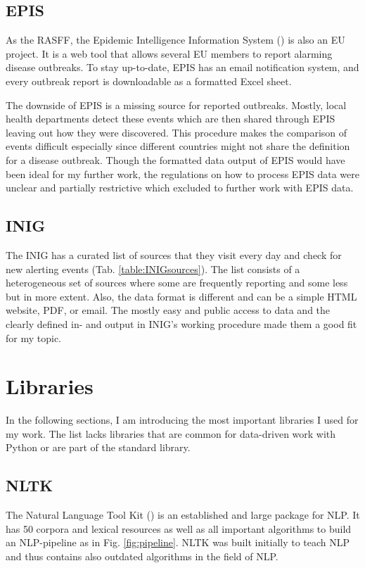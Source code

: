 \subsection{EPIS}
As the RASFF, the Epidemic Intelligence Information System () is also an EU project. It is a web tool that allows several EU members to report alarming disease outbreaks. To stay up-to-date, EPIS has an email notification system, and every outbreak report is downloadable as a formatted Excel sheet.

The downside of EPIS is a missing source for reported outbreaks. Mostly, local health departments detect these events which are then shared through EPIS leaving out how they were discovered. This procedure makes the comparison of events difficult especially since different countries might not share the definition for a disease outbreak.
Though the formatted data output of EPIS would have been ideal for my further work, the regulations on how to process EPIS data were unclear and partially restrictive which excluded to further work with EPIS data.

\subsection{INIG}\label{INIGsources}
The INIG has a curated list of sources that they visit every day and check for new alerting events (Tab. \ref{table:INIGsources}).
The list consists of a heterogeneous set of sources where some are frequently reporting and some less but in more extent. Also, the data format is different and can be a simple HTML website, PDF, or email.
The mostly easy and public access to data and the clearly defined in- and output in INIG's working procedure made them a good fit for my topic.

\section{Libraries}
In the following sections, I am introducing the most important libraries I used for my work.
The list lacks libraries that are common for data-driven work with Python or are part of the standard library.

\subsection{NLTK}
The Natural Language Tool Kit () is an established and large package for NLP.
It has 50 corpora and lexical resources as well as all important algorithms to build an NLP-pipeline as in Fig. \ref{fig:pipeline}.
NLTK was built initially to teach NLP and thus contains also outdated algorithms in the field of NLP.

